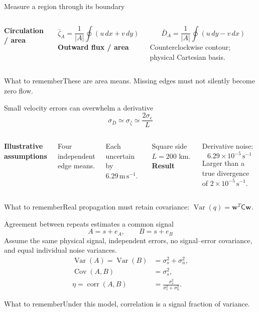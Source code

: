 \documentclass[aspectratio=169,11pt]{beamer}
\newcommand{\prov}{}
\newcommand{\evidence}[1]{\gdef\prov{#1}}
\newcommand{\takeaway}[1]{\vspace{0.3em}\begin{block}{What to remember}#1\end{block}}
\newcommand{\ms}{\mathrm{m\,s^{-1}}}
\newcommand{\sone}{\mathrm{s^{-1}}}
\newcommand{\Var}{\operatorname{Var}}
\newcommand{\Cov}{\operatorname{Cov}}
\begin{document}
\evidence{Original derivation of the contour principle; exact original quadrature remains unverified.}
\begin{frame}{Measure a region through its boundary}
 \begin{columns}[c]
 \textbf{Circulation / area}\par
 \[\bar\zeta_A=\frac{1}{|A|}\oint(u\,dx+v\,dy)\]
 \textbf{Outward flux / area}\par
 \[\bar D_A=\frac{1}{|A|}\oint(u\,dy-v\,dx)\]
 Counterclockwise contour; physical Cartesian basis.
 \end{columns}
 \takeaway{These are area means. Missing edges must not silently become zero flow.}
\end{frame}

\evidence{Original synthetic uncertainty example; assumes four independent edge-mean errors.}
\begin{frame}{Small velocity errors can overwhelm a derivative}
 \[\sigma_{\bar D}\simeq\sigma_{\bar\zeta}\simeq\frac{2\sigma_e}{L}\]
 \begin{columns}[T]
 \textbf{Illustrative assumptions}\par
 Four independent edge means.\par
 Each uncertain by $6.29\,\ms$.\par
 Square side $L=200$ km.
 \textbf{Result}\par
 Derivative noise:
 \[6.29\times10^{-5}\,\sone\]
 Larger than a true divergence of
 $2\times10^{-5}\,\sone$.
 \end{columns}
 \takeaway{Real propagation must retain covariance: $\Var(q)=\bm w^T\mathsf C\bm w$.}
\end{frame}

\evidence{Original derivation of a repeat-measurement error model; compare Ingersoll et al., Eqs. 1--2.}
\begin{frame}{Agreement between repeats estimates a common signal}
 \[A=s+e_A,\qquad B=s+e_B\]
 Assume the same physical signal, independent errors, no signal--error
 covariance, and equal individual noise variances.
 \begin{align*}
 \Var(A)=\Var(B)&=\sigma_s^2+\sigma_n^2,\\
 \Cov(A,B)&=\sigma_s^2,\\
 \eta=\operatorname{corr}(A,B)&=\frac{\sigma_s^2}{\sigma_s^2+\sigma_n^2}.
 \end{align*}
 \takeaway{Under this model, correlation is a signal fraction of variance.}
\end{frame}
\end{document}
